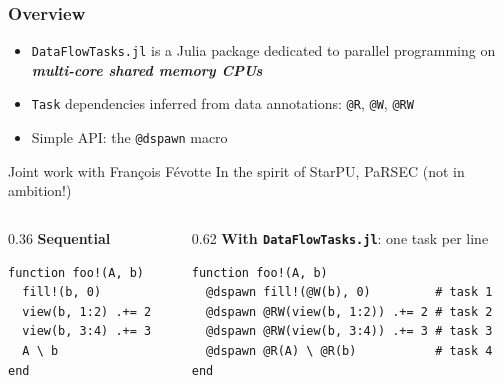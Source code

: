 \documentclass{beamer}
\newcommand{\DFT}{\texttt{DataFlowTasks.jl}}
\begin{document}
\begin{frame}[fragile]
	\frametitle{Overview}
	\begin{itemize}
		\item \DFT{} is a Julia package dedicated to parallel programming on \textit{\textbf{multi-core shared memory CPUs}}
		\item \texttt{Task} dependencies inferred from \alert{data} annotations: \texttt{@R}, \texttt{@W}, \texttt{@RW}
		\item Simple API: the \texttt{@dspawn} macro
	\end{itemize}
	{\scriptsize\color{gray} Joint work with François Févotte}\hfill{\scriptsize\color{gray} In the spirit of StarPU, PaRSEC (not in ambition!)}

	\begin{columns}[T]
		\begin{column}{0.36\textwidth}
			\textbf{Sequential}
			\begin{verbatim}
function foo!(A, b)
  fill!(b, 0)
  view(b, 1:2) .+= 2
  view(b, 3:4) .+= 3
  A \ b
end
			\end{verbatim}
			\centering
		\end{column}
		\begin{column}{0.62\textwidth}
			\textbf{With \DFT}: one task per line
			\begin{verbatim}
function foo!(A, b)
  @dspawn fill!(@W(b), 0)         # task 1
  @dspawn @RW(view(b, 1:2)) .+= 2 # task 2
  @dspawn @RW(view(b, 3:4)) .+= 3 # task 3
  @dspawn @R(A) \ @R(b)           # task 4
end
			\end{verbatim}
			\centering
		\end{column}
	\end{columns}
\end{frame}
\end{document}
